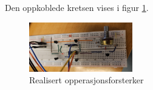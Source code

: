 Den oppkoblede kretsen vises i figur \ref{fig:diffamp_realisert}.

\begin{figure}[!h]
    \centering
    \includegraphics[width=0.4\textwidth, angle=90]{Bilder/feilBilde.jpg}
    \caption{Realisert opperasjonsforsterker}
    \label{fig:diffamp_realisert}
\end{figure}
